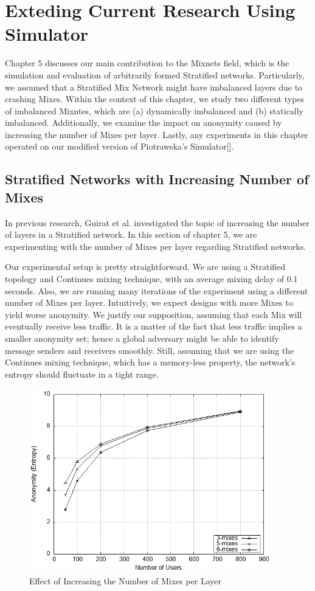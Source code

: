 \documentclass[logo,msc,cyber]{infthesis}   %
\begin{document}
\chapter{Exteding Current Research Using Simulator}
Chapter 5 discusses our main contribution to the Mixnets field, which is the
simulation and evaluation of arbitrarily formed Stratified networks.
Particularly, we assumed that a Stratified Mix Network might have imbalanced
layers due to crashing Mixes. Within the context of this chapter, we study two
different types of imbalanced Mixntes, which are (a) dynamically imbalanced and
(b) statically imbalanced. Additionally, we examine the impact on anonymity
caused by increasing the number of Mixes per layer. Lastly, any experiments in
this chapter operated on our modified version of Piotrawska's Simulator[].

\section{Stratified Networks with Increasing Number of Mixes}

In previous research, Guirat et al. investigated the topic of increasing the
number of layers in a Stratified network. In this section of chapter 5, we are
experimenting with the number of Mixes per layer regarding Stratified networks.

Our experimental setup is pretty straightforward. We are using a Stratified
topology and Continues mixing technique, with an average mixing delay of 0.1
seconds. Also, we are running many iterations of the experiment using a
different number of Mixes per layer. Intuitively, we expect designs with more
Mixes to yield worse anonymity. We justify our supposition, assuming that each
Mix will eventually receive less traffic. It is a matter of the fact that less
traffic implies a smaller anonymity set; hence a global adversary might be able
to identify message senders and receivers smoothly. Still, assuming that we are
using the Continues mixing technique, which has a memory-less property, the
network's entropy should fluctuate in a tight range.

\begin{figure}[h!]
    \centering
    \includegraphics[height=8cm]{figures/simulator_extentions/compare_layer_size.png}
    \caption{Effect of Increasing the Number of Mixes per Layer}
    \label{fig:stratified-incresing-number-of-mixes}
\end{figure}    
\end{document}
